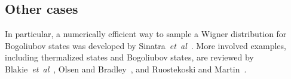 \subsection{Other cases}

In particular, a numerically efficient way to sample a Wigner distribution for Bogoliubov states was developed by Sinatra~\textit{et~al}~\cite{Sinatra2002}.
More involved examples, including thermalized states and Bogoliubov states, are reviewed by Blakie~\textit{et~al}~\cite{Blakie2008}, Olsen and Bradley~\cite{Olsen2009}, and Ruostekoski and Martin~\cite{Ruostekoski2010}.
